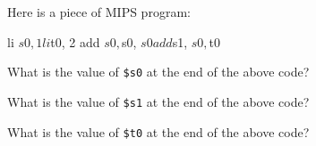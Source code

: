 

\renewcommand\AUTHOR{aoro1@cougars.ccis.edu} %


\topmattertwo


Here is a piece of MIPS program:
\begin{console}
li     $s0, 1
li     $t0, 2
add    $s0, $s0, $s0
add    $s1, $s0, $t0
\end{console}


\nextq
What is the value of \verb!$s0! at the end of the above code?


\nextq
What is the value of \verb!$s1! at the end of the above code?


\nextq
What is the value of \verb!$t0! at the end of the above code?


\newpage



